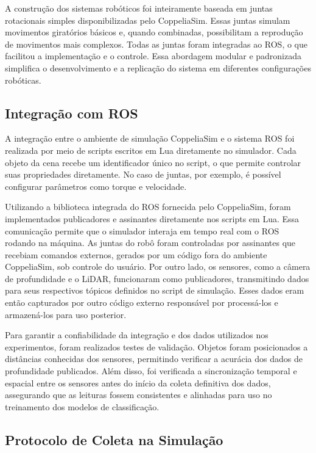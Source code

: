 A construção dos sistemas robóticos foi inteiramente baseada em juntas rotacionais simples disponibilizadas pelo CoppeliaSim. Essas juntas simulam movimentos giratórios básicos e, quando combinadas, possibilitam a reprodução de movimentos mais complexos. Todas as juntas foram integradas ao ROS, o que facilitou a implementação e o controle. Essa abordagem modular e padronizada simplifica o desenvolvimento e a replicação do sistema em diferentes configurações robóticas.

\subsection{Integração com ROS}

A integração entre o ambiente de simulação CoppeliaSim e o sistema ROS foi realizada por meio de scripts escritos em Lua diretamente no simulador. Cada objeto da cena recebe um identificador único no script, o que permite controlar suas propriedades diretamente. No caso de juntas, por exemplo, é possível configurar parâmetros como torque e velocidade.

Utilizando a biblioteca integrada do ROS fornecida pelo CoppeliaSim, foram implementados publicadores e assinantes diretamente nos scripts em Lua. Essa comunicação permite que o simulador interaja em tempo real com o ROS rodando na máquina. As juntas do robô foram controladas por assinantes que recebiam comandos externos, gerados por um código fora do ambiente CoppeliaSim, sob controle do usuário. Por outro lado, os sensores, como a câmera de profundidade e o LiDAR, funcionaram como publicadores, transmitindo dados para seus respectivos tópicos definidos no script de simulação. Esses dados eram então capturados por outro código externo responsável por processá-los e armazená-los para uso posterior.

Para garantir a confiabilidade da integração e dos dados utilizados nos experimentos, foram realizados testes de validação. Objetos foram posicionados a distâncias conhecidas dos sensores, permitindo verificar a acurácia dos dados de profundidade publicados. Além disso, foi verificada a sincronização temporal e espacial entre os sensores antes do início da coleta definitiva dos dados, assegurando que as leituras fossem consistentes e alinhadas para uso no treinamento dos modelos de classificação.

\subsection{Protocolo de Coleta na Simulação}

